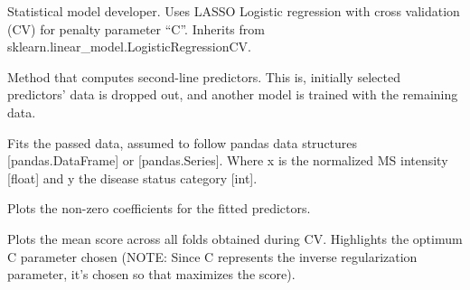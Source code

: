 \documentclass[letterpaper,10pt,english]{sphinxmanual}
\begin{document}
\begin{fulllineitems}
Statistical model developer. Uses LASSO Logistic regression with cross
validation (CV) for penalty parameter “C”. Inherits from
sklearn.linear\_model.LogisticRegressionCV.

\begin{fulllineitems}
\label{\detokenize{Lasso:data_tools.Lasso.Lasso.compute_second_line}}
Method that computes second-line predictors. This is, initially
selected predictors’ data is dropped out, and another model is trained
with the remaining data.

\end{fulllineitems}


\begin{fulllineitems}
\label{\detokenize{Lasso:data_tools.Lasso.Lasso.fit_data}}
Fits the passed data, assumed to follow pandas data structures
{[}pandas.DataFrame{]} or {[}pandas.Series{]}. Where x is the normalized MS
intensity {[}float{]} and y the disease status category {[}int{]}.

\end{fulllineitems}


\begin{fulllineitems}
\label{\detokenize{Lasso:data_tools.Lasso.Lasso.plot_coef}}
Plots the non-zero coefficients for the fitted predictors.

\end{fulllineitems}


\begin{fulllineitems}
\label{\detokenize{Lasso:data_tools.Lasso.Lasso.plot_sample_probs}}
\end{fulllineitems}


\begin{fulllineitems}
\label{\detokenize{Lasso:data_tools.Lasso.Lasso.plot_score}}
Plots the mean score across all folds obtained during CV. Highlights
the optimum C parameter chosen (NOTE: Since C represents the inverse
regularization parameter, it’s chosen so that maximizes the score).

\end{fulllineitems}


\end{fulllineitems}
\end{document}
